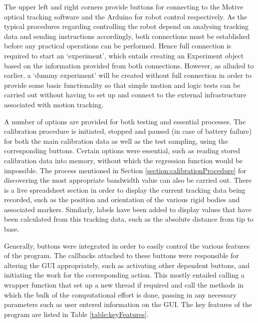 \documentclass[11pt]{article}
\begin{document}
The upper left and right corners provide buttons for connecting to the Motive optical tracking software and the Arduino for robot control respectively. As the typical procedures regarding controlling the robot depend on analysing tracking data and sending instructions accordingly, both connections must be established before any practical operations can be performed. Hence full connection is required to start an `experiment', which entails creating an Experiment object based on the information provided from both connections. However, as alluded to earlier, a `dummy experiment' will be created without full connection in order to provide some basic functionality so that simple motion and logic tests can be carried out without having to set up and connect to the external infrastructure associated with motion tracking. 

A number of options are provided for both testing and essential processes. The calibration procedure is initiated, stopped and paused (in case of battery failure) for both the main calibration data as well as the test sampling, using the corresponding buttons. Certain options were essential, such as reading stored calibration data into memory, without which the regression function would be impossible. The process mentioned in Section \ref{section:calibrationProcedure} for discovering the most appropriate bandwidth value can also be carried out. There is a live spreadsheet section in order to display the current tracking data being recorded, such as the position and orientation of the various rigid bodies and associated markers. Similarly, labels have been added to display values that have been calculated from this tracking data, such as the absolute distance from tip to base. 

Generally, buttons were integrated in order to easily control the various features of the program. The callbacks attached to these buttons were responsible for altering the GUI appropriately, such as activating other dependent buttons, and initiating the work for the corresponding action. This mostly entailed calling a wrapper function that set up a new thread if required and call the methods in which the bulk of the computational effort is done, passing in any necessary parameters such as user entered information on the GUI. The key features of the program are listed in Table \ref{table:keyFeatures}.

\pagebreak
\end{document}
